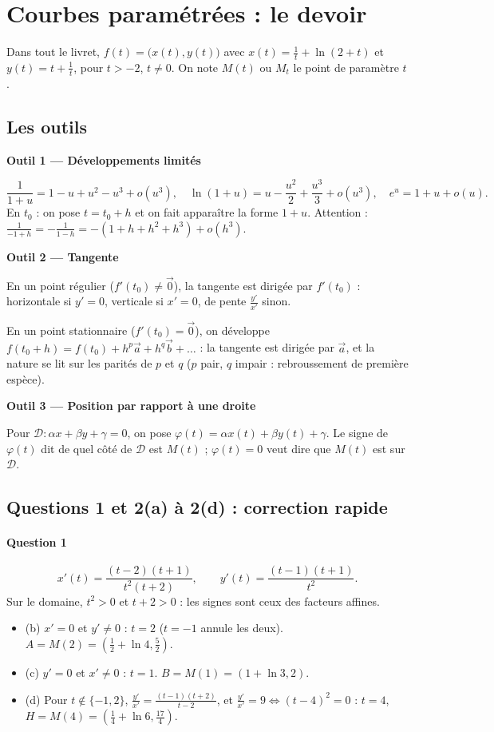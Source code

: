 \documentclass[a4paper,11pt]{article}
\numberwithin{equation}{section}
\numberwithin{figure}{section}
\numberwithin{table}{section}
\theoremstyle{enonce}
\theoremstyle{exemple}
\theoremstyle{remarque}
\newcommand{\ve}[1]{\vec{#1}}
\newif\ifonglets \ongletsfalse
\newcommand{\Outil}[2]{\begin{enoncebox}{\sffamily\bfseries\small\color{Bleu}#1}\par\smallskip #2\end{enoncebox}}
\begin{document}
\vfill
\renewcommand{\contentsname}{Sommaire}
\hypertarget{toc}{}
\tableofcontents
\clearpage
\ongletstrue
\section{Courbes paramétrées : le devoir}\label{sec:ds}

Dans tout le livret, $f(t)=\big(x(t),y(t)\big)$ avec $x(t)=\frac1t+\ln(2+t)$ et $y(t)=t+\frac1t$, pour $t>-2$, $t\neq0$. On
note $M(t)$ ou $M_t$ le point de paramètre $t$.

\subsection{Les outils}\label{q:outils}

\Outil{Outil 1 — Développements limités}{%
\[\frac1{1+u}=1-u+u^2-u^3+o(u^3),\quad \ln(1+u)=u-\frac{u^2}2+\frac{u^3}3+o(u^3),\quad e^u=1+u+o(u).\]
En $t_0$ : on pose $t=t_0+h$ et on fait apparaître la forme $1+u$. Attention : $\frac1{-1+h}=-\frac1{1-h}=-(1+h+h^2+h^3)+o(h^3)$.}

\Outil{Outil 2 — Tangente}{%
En un point régulier ($f'(t_0)\neq\ve0$), la tangente est dirigée par $f'(t_0)$ : horizontale si $y'=0$, verticale si $x'=0$,
de pente $\frac{y'}{x'}$ sinon.\par
En un point stationnaire ($f'(t_0)=\ve0$), on développe $f(t_0+h)=f(t_0)+h^p\ve a+h^q\ve b+\dots$ : la tangente est dirigée par
$\ve a$, et la nature se lit sur les parités de $p$ et $q$ ($p$ pair, $q$ impair : rebroussement de première espèce).}

\Outil{Outil 3 — Position par rapport à une droite}{%
Pour $\mathcal D:\alpha x+\beta y+\gamma=0$, on pose $\varphi(t)=\alpha x(t)+\beta y(t)+\gamma$. Le signe de $\varphi(t)$ dit de
quel côté de $\mathcal D$ est $M(t)$ ; $\varphi(t)=0$ veut dire que $M(t)$ est sur $\mathcal D$.}

\clearpage
\subsection{Questions 1 et 2(a) à 2(d) : correction rapide}\label{q:reussies}

\paragraph{Question 1}
\[x'(t)=\frac{(t-2)(t+1)}{t^2(t+2)},\qquad y'(t)=\frac{(t-1)(t+1)}{t^2}.\]
Sur le domaine, $t^2>0$ et $t+2>0$ : les signes sont ceux des facteurs affines.
\begin{itemize}[leftmargin=1.2em,itemsep=2pt]
\item (b) $x'=0$ et $y'\neq0$ : $t=2$ ($t=-1$ annule les deux). $A=M(2)=\left(\frac12+\ln4,\frac52\right)$.
\item (c) $y'=0$ et $x'\neq0$ : $t=1$. $B=M(1)=(1+\ln3,2)$.
\item (d) Pour $t\notin\{-1,2\}$, $\frac{y'}{x'}=\frac{(t-1)(t+2)}{t-2}$, et $\frac{y'}{x'}=9\iff(t-4)^2=0$ : $t=4$,
$H=M(4)=\left(\frac14+\ln6,\frac{17}4\right)$.
\end{itemize}
\end{document}
